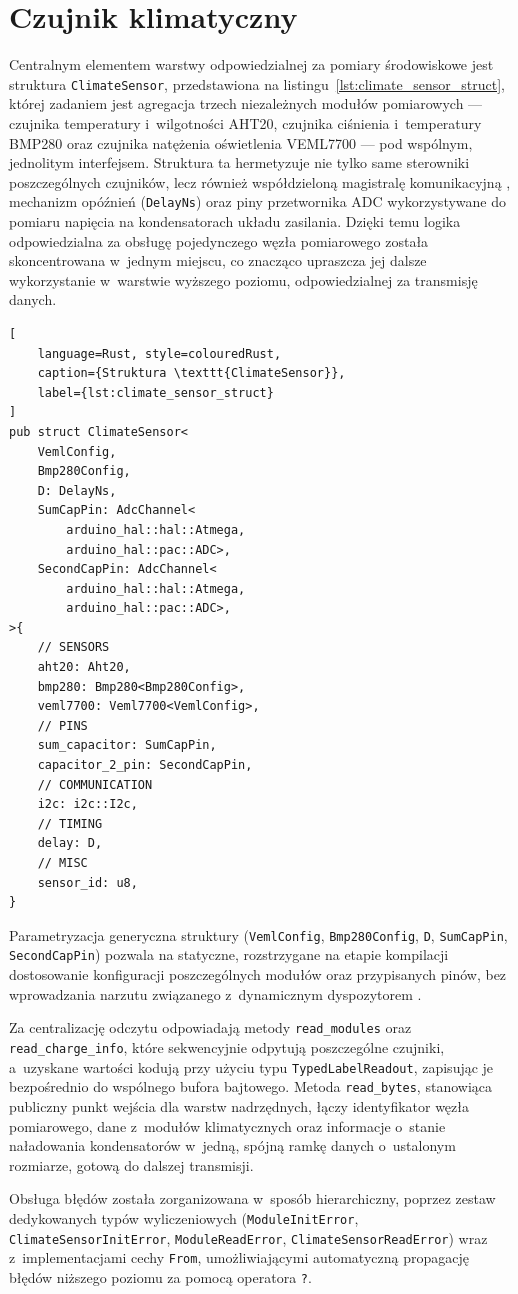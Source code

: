 \section{Czujnik klimatyczny}
Centralnym elementem warstwy odpowiedzialnej za pomiary środowiskowe 
jest struktura \texttt{ClimateSensor}, przedstawiona na 
listingu~\ref{lst:climate_sensor_struct}, której zadaniem jest agregacja 
trzech niezależnych modułów pomiarowych — czujnika temperatury 
i~wilgotności AHT20, czujnika ciśnienia i~temperatury BMP280 oraz 
czujnika natężenia oświetlenia VEML7700 — pod wspólnym, 
jednolitym interfejsem. 
Struktura ta hermetyzuje nie tylko same sterowniki poszczególnych 
czujników, lecz również współdzieloną magistralę komunikacyjną \isqrc{}, 
mechanizm opóźnień (\texttt{DelayNs}) oraz piny przetwornika ADC 
wykorzystywane do pomiaru napięcia na kondensatorach układu zasilania. 
Dzięki temu logika odpowiedzialna za obsługę pojedynczego węzła pomiarowego 
została skoncentrowana w~jednym miejscu, co znacząco upraszcza jej dalsze 
wykorzystanie w~warstwie wyższego poziomu, odpowiedzialnej za transmisję danych.

\begin{lstlisting}[
    language=Rust, style=colouredRust, 
    caption={Struktura \texttt{ClimateSensor}},
    label={lst:climate_sensor_struct}
]
pub struct ClimateSensor<
    VemlConfig, 
    Bmp280Config, 
    D: DelayNs,
    SumCapPin: AdcChannel<
        arduino_hal::hal::Atmega, 
        arduino_hal::pac::ADC>,
    SecondCapPin: AdcChannel<
        arduino_hal::hal::Atmega, 
        arduino_hal::pac::ADC>,
>{
    // SENSORS
    aht20: Aht20,
    bmp280: Bmp280<Bmp280Config>,
    veml7700: Veml7700<VemlConfig>,
    // PINS
    sum_capacitor: SumCapPin,
    capacitor_2_pin: SecondCapPin,
    // COMMUNICATION
    i2c: i2c::I2c,
    // TIMING
    delay: D,
    // MISC
    sensor_id: u8,
}
\end{lstlisting}

Parametryzacja generyczna struktury (\texttt{VemlConfig}, \texttt{Bmp280Config}, 
\texttt{D}, \texttt{SumCapPin}, \texttt{SecondCapPin}) pozwala na statyczne, 
rozstrzygane na etapie kompilacji dostosowanie konfiguracji poszczególnych 
modułów oraz przypisanych pinów, bez wprowadzania narzutu związanego 
z~dynamicznym dyspozytorem .

Za centralizację odczytu odpowiadają metody \texttt{read\_modules} oraz 
\texttt{read\_charge\_info}, które sekwencyjnie odpytują poszczególne czujniki, 
a~uzyskane wartości kodują przy użyciu typu \texttt{TypedLabelReadout}, 
zapisując je bezpośrednio do wspólnego bufora bajtowego. 
Metoda \texttt{read\_bytes}, stanowiąca publiczny punkt wejścia dla warstw 
nadrzędnych, łączy identyfikator węzła pomiarowego, dane z~modułów klimatycznych 
oraz informacje o~stanie naładowania kondensatorów w~jedną, spójną ramkę danych 
o~ustalonym rozmiarze, gotową do dalszej transmisji.

Obsługa błędów została zorganizowana w~sposób hierarchiczny, poprzez zestaw 
dedykowanych typów wyliczeniowych (\texttt{ModuleInitError}, 
\texttt{ClimateSensorInitError}, \texttt{ModuleReadError}, 
\texttt{ClimateSensorReadError}) wraz z~implementacjami cechy \texttt{From}, 
umożliwiającymi automatyczną propagację błędów niższego poziomu za 
pomocą operatora \texttt{?}.